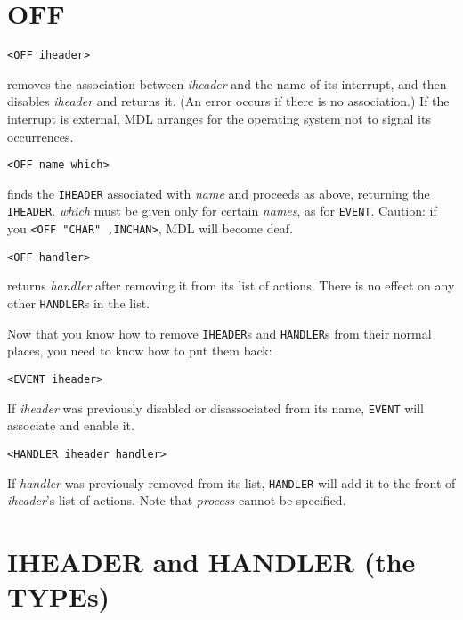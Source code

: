 \documentclass[a4paper]{scrbook}
\begin{document}
\section{OFF}\label{off}

\begin{verbatim}
<OFF iheader>
\end{verbatim}

 removes the association between \emph{iheader} and the name of its interrupt, and then disables
\emph{iheader} and returns it. (An error occurs if there is no association.) If the interrupt is external, MDL arranges for
the operating system not to signal its occurrences.

\begin{verbatim}
<OFF name which>
\end{verbatim}

finds the \texttt{IHEADER} associated with \emph{name} and proceeds as above, returning the \texttt{IHEADER}. \emph{which}
must be given only for certain \emph{names}, as for \texttt{EVENT}. Caution: if you
\texttt{\textless{}OFF\ "CHAR"\ ,INCHAN\textgreater{}}, MDL will become deaf.

\begin{verbatim}
<OFF handler>
\end{verbatim}

returns \emph{handler} after removing it from its list of actions. There is no effect on any other
\texttt{HANDLER}s in the list.

Now that you know how to remove \texttt{IHEADER}s and \texttt{HANDLER}s from their normal places, you need to know how to
put them back:

\begin{verbatim}
<EVENT iheader>
\end{verbatim}

If \emph{iheader} was previously disabled or disassociated from its name, \texttt{EVENT} will associate and enable it.

\begin{verbatim}
<HANDLER iheader handler>
\end{verbatim}

If \emph{handler} was previously removed from its list, \texttt{HANDLER} will add it to the front of \emph{iheader}'s list
of actions. Note that \emph{process} cannot be specified.

\section{IHEADER and HANDLER (the TYPEs)}\label{iheader-and-handler-the-types}
\end{document}

